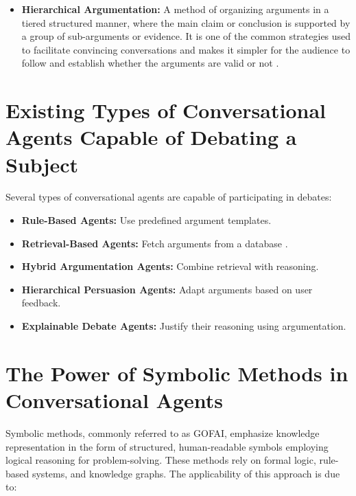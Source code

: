 \documentclass[conference]{IEEEtran}
\begin{document}
\begin{itemize}
    \item \textbf{Hierarchical Argumentation:} A method of organizing arguments in a tiered structured manner, where the main claim or conclusion is supported by a group of sub-arguments or evidence. It is one of the common strategies used to facilitate convincing conversations and makes it simpler for the audience to follow and establish whether the arguments are valid or not  \cite{b5}.
\end{itemize}

\section{Existing Types of Conversational Agents Capable of Debating a Subject}
Several types of conversational agents are capable of participating in debates:

\begin{itemize}
    \item \textbf{Rule-Based Agents:} Use predefined argument templates.
    \item \textbf{Retrieval-Based Agents:} Fetch arguments from a database \cite{b3}.
    \item \textbf{Hybrid Argumentation Agents:} Combine retrieval with reasoning.
    \item \textbf{Hierarchical Persuasion Agents:} Adapt arguments based on user feedback.
    \item \textbf{Explainable Debate Agents:} Justify their reasoning using argumentation.
\end{itemize}


\section{The Power of Symbolic Methods in Conversational Agents}
Symbolic methods, commonly referred to as GOFAI, emphasize knowledge representation in the form of structured, human-readable symbols employing logical reasoning for problem-solving. These methods rely on formal logic, rule-based systems, and knowledge graphs. The applicability of this approach is due to:
\end{document}

